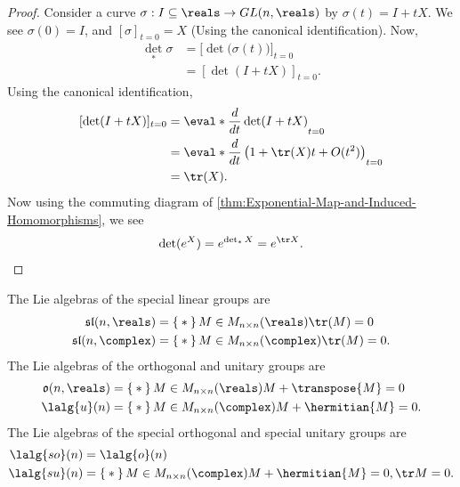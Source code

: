\documentclass[../main.tex]{subfiles}
\begin{document}
\begin{proof}
    Consider a curve \(\sigma : I \subseteq \reals \to \GL{n}{\reals}\)
    by \(\sigma(t) = I + tX\). We see \(\sigma(0) = I\), and
    \([\sigma]_{t=0} = X\) (Using the canonical identification). Now,
    \[
        \begin{aligned}
            \det_*\sigma &= \Big[\det\big(\sigma(t)\big)\Big]_{t=0} \\
                         &= [\det(I+tX)]_{t=0}.
        \end{aligned}
    \]
    Using the canonical identification, 
    \[
        \begin{aligned}
            [\det(I+tX)]_{t=0} &= \eval*{\frac{d}{dt}\det(I+tX)}_{t=0} \\
                              &=\eval*{\frac{d}{dt}\left( 1+\tr(X)t + O(t^2) \right) }_{t=0}\\
                              &= \tr(X).
        \end{aligned}
    \]
    Now using the commuting diagram of
    \cref{thm:Exponential-Map-and-Induced-Homomorphisms}, we see
    \[
    \det(e^{X}) = e^{\det_*X} = e^{\tr X}.
    \]
\end{proof}
\begin{theorem}
\label{thm:Lie-Algebras-of-Classical-Groups}
    The Lie algebras of the special linear groups are
    \[
        \begin{aligned}
            \spli{n}{\reals} &= \Set*{M \in M_{n\times
            n}(\reals)}{\tr(M)=0} \\
            \spli{n}{\complex} &= \Set*{M \in M_{n\times
        n}(\complex)}{\tr(M)=0}.
        \end{aligned}
    \]
    The Lie algebras of the orthogonal and unitary groups are
    \[
        \begin{aligned}
        \orth{n}{\reals} &= \Set*{M \in M_{n \times
        n}(\reals)}{M+\transpose{M} = 0} \\
        \lalg{u}(n) &= \Set*{M \in M_{n \times n}(\complex)}{M +
        \hermitian{M} = 0}.
        \end{aligned}
    \]
    The Lie algebras of the special orthogonal and special unitary groups
    are
    \[
    \begin{aligned}
        \lalg{so}(n) &= \lalg{o}(n) \\
    \lalg{su}(n) &= \Set*{M \in M_{n \times n}(\complex)}{M +
    \hermitian{M} = 0, \tr M = 0}.
    \end{aligned}
    \]
\end{theorem}
\end{document}
